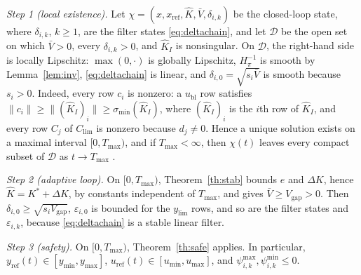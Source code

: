 \documentclass[lettersize,journal]{IEEEtran}
\newcommand{\Kh}{\hat{K}}
\newcommand{\xr}{x_{\mathrm{ref}}}
\newcommand{\ub}{u_{\mathrm{bl}}}
\newcommand{\uref}{u_{\mathrm{ref}}}
\newcommand{\yref}{y_{\mathrm{ref}}}
\newcommand{\Clim}{C_{\mathrm{lim}}}
\newcommand{\ylim}{y_{\mathrm{lim}}}
\newcommand{\Vb}{\bar{V}}
\newcommand{\Vg}{V_{\mathrm{gap}}}
\begin{document}
\begin{IEEEproof}
\emph{Step 1 (local existence).} Let $\chi=(x,\xr,\Kh,\Vb,\delta_{i,k})$ be the closed-loop state, where $\delta_{i,k}$, $k\ge1$, are the filter states \eqref{eq:deltachain}, and let $\mathcal{D}$ be the open set on which $\Vb>0$, every $\delta_{i,k}>0$, and $\Kh_I$ is nonsingular. On $\mathcal{D}$, the right-hand side is locally Lipschitz: $\max(0,\cdot)$ is globally Lipschitz, $H_\pi^{-1}$ is smooth by Lemma~\ref{lem:inv}, \eqref{eq:deltachain} is linear, and $\delta_{i,0}=\sqrt{s_i\Vb}$ is smooth because $s_i>0$. Indeed, every row $c_i$ is nonzero: a $\ub$ row satisfies $\|c_i\|\ge\|(\Kh_I)_i\|\ge\sigma_{\min}(\Kh_I)$, where $(\Kh_I)_i$ is the $i$th row of $\Kh_I$, and every row $C_j$ of $\Clim$ is nonzero because $d_j\ne0$. Hence a unique solution exists on a maximal interval $[0,T_{\max})$, and if $T_{\max}<\infty$, then $\chi(t)$ leaves every compact subset of $\mathcal{D}$ as $t\to T_{\max}$ \cite[Sec.~3.1]{khalil2002}.

\emph{Step 2 (adaptive loop).} On $[0,T_{\max})$, Theorem~\ref{th:stab} bounds $e$ and $\Delta K$, hence $\Kh=K^*+\Delta K$, by constants independent of $T_{\max}$, and gives $\Vb\ge\Vg>0$. Then $\delta_{i,0}\ge\sqrt{s_i\Vg}$, $\varepsilon_{i,0}$ is bounded for the $\ylim$ rows, and so are the filter states and $\varepsilon_{i,k}$, because \eqref{eq:deltachain} is a stable linear filter.

\emph{Step 3 (safety).} On $[0,T_{\max})$, Theorem~\ref{th:safe} applies. In particular, $\yref(t)\in[y_{\min},y_{\max}]$, $\uref(t)\in[u_{\min},u_{\max}]$, and $\psi^{\max}_{i,k},\psi^{\min}_{i,k}\le0$.


\end{IEEEproof}
\end{document}

